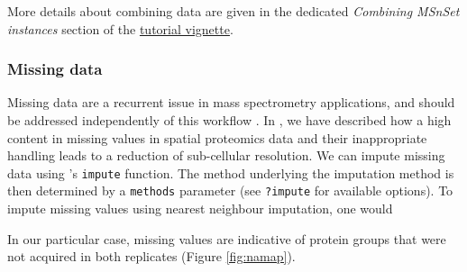 More details about combining data are given in the dedicated
\textit{Combining MSnSet instances} section of the 
\href{http://bioconductor.org/packages/release/bioc/vignettes/MSnbase/inst/doc/MSnbase-demo.pdf}{tutorial
  vignette}.

\subsubsection*{Missing data}

Missing data are a recurrent issue in mass spectrometry applications,
and should be addressed independently of this workflow
\cite{Webb-Robertson:2015,Lazar:2016}. In \cite{Gatto:2014b}, we have
described how a high content in missing values in spatial proteomics
data and their inappropriate handling leads to a reduction of
sub-cellular resolution. We can impute missing data using
's \texttt{impute} function. The method underlying
the imputation method is then determined by a \texttt{methods}
parameter (see \texttt{?impute} for available options). To impute
missing values using nearest neighbour imputation, one would

\begin{knitrout}
\color{fgcolor}\begin{kframe}
\begin{alltt}
 \hlkwb{<-}   \hlstd{=} \hlstd{)}
\end{alltt}
\end{kframe}
\end{knitrout}

In our particular case, missing values are indicative of protein
groups that were not acquired in both replicates (Figure
\ref{fig:namap}).

